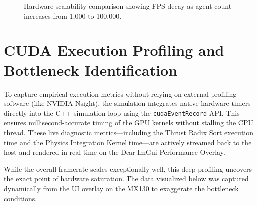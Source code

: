 \documentclass[12pt,a4paper]{report}
\begin{document}
\begin{figure}[H]
    \centering
    \caption{Hardware scalability comparison showing FPS decay as agent count increases from 1,000 to 100,000.}
    \label{fig:scalability_graph}
\end{figure}

\section{CUDA Execution Profiling and Bottleneck Identification}
To capture empirical execution metrics without relying on external profiling software (like NVIDIA Nsight), the simulation integrates native hardware timers directly into the C++ simulation loop using the \texttt{cudaEventRecord} API. This ensures millisecond-accurate timing of the GPU kernels without stalling the CPU thread. These live diagnostic metrics—including the Thrust Radix Sort execution time and the Physics Integration Kernel time—are actively streamed back to the host and rendered in real-time on the Dear ImGui Performance Overlay. 

While the overall framerate scales exceptionally well, this deep profiling uncovers the exact point of hardware saturation. The data visualized below was captured dynamically from the UI overlay on the MX130 to exaggerate the bottleneck conditions. 
\end{document}
